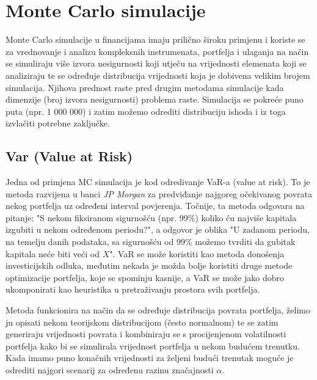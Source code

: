 \documentclass[times, utf8, seminar]{fer}
\begin{document}

\chapter{Monte Carlo simulacije}

Monte Carlo simulacije u financijama imaju prilično široku primjenu i koriste se za vrednovanje i analizu kompleksnih instrumenata, portfelja i ulaganja na način se simuliraju više izvora nesigurnosti koji utječu na vrijednosti elemenata koji se analiziraju te se određuje distribucija vrijednosti koja je dobivena velikim brojem simulacija. Njihova prednost raste pred drugim metodama simulacije kada dimenzije (broj izvora nesigurnosti) problema raste. Simulacija se pokreće puno puta (npr. 1 000 000) i zatim možemo odrediti distribuciju ishoda i iz toga izvlačiti potrebne zaključke.

\section{Var (Value at Risk)}
Jedna od primjena MC simulacija je kod odredivanje VaR-a (value at risk). To je metoda razvijena u banci \emph{JP Morgan} za predviđanje najgoreg očekivanog povrata nekog portfelja uz određeni interval povjerenja. Točnije, ta metoda odgovara na pitanje: "S nekom fiksiranom sigurnošću (npr. 99\%) koliko ću najviše kapitala izgubiti u nekom određenom periodu?", a odgovor je oblika "U zadanom periodu, na temelju danih podataka, sa sigurnošću od 99\% možemo tvrditi da gubitak kapitala neće biti veći od $X$". VaR se može koristiti kao metoda donošenja investicijskih odluka, međutim nekada je možda bolje koristiti druge metode optimizacije portfelja, koje se spominju kasnije, a VaR se može jako dobro ukomponirati kao heuristika u pretraživanju prostora svih portfelja.



Metoda funkcionira na način da se određuje distribucija povrata portfelja, želimo ju opisati nekom teorijskom distribucijom (često normalnom) te se zatim generiraju vrijednosti povrata i kombiniraju se s procijenjenom volatilnosti portfelja kako bi se simulirala vrijednost portfelja u nekom budućem trenutku. Kada imamo puno konačnih vrijednosti za željeni budući trenutak moguće je odrediti najgori scenarij za određenu razinu značajnosti $\alpha$.
\end{document}
